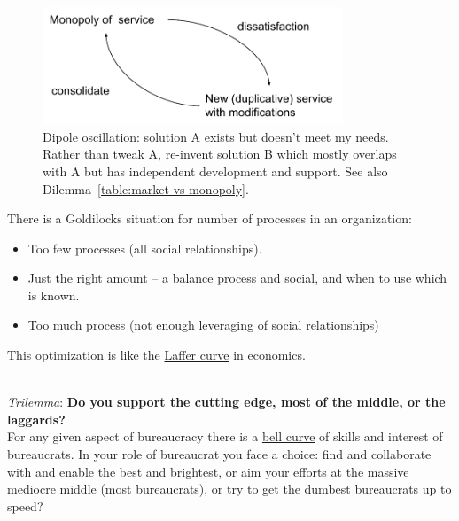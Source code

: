 \begin{figure}[H] %
    \centering
    \includegraphics[width=0.8\textwidth]{images/dilemma_market_vs_monopoly.pdf}
    \caption{Dipole oscillation: solution A exists but doesn't meet my needs. Rather than tweak A, re-invent solution B which mostly overlaps with A but has independent development and support. See also Dilemma~\ref{table:market-vs-monopoly}.}
    \label{fig:market-vs-monopoly}
\end{figure}



There is a Goldilocks situation for number of processes in an organization:
\begin{itemize}
    \item Too few processes (all social relationships).
    \item Just the right amount -- a balance process and social, and when to use which is known.
    \item Too much process (not enough leveraging of social relationships)
\end{itemize}
This optimization is like the \href{https://en.wikipedia.org/wiki/Laffer_curve}{Laffer curve} in economics.

\ \\

\textit{Trilemma}: \textbf{Do you support the cutting edge, most of the middle, or the laggards?}\\
For any given aspect of bureaucracy there is a \href{https://en.wikipedia.org/wiki/Normal_distribution}{bell curve} 
of skills and interest of bureaucrats. In your role of bureaucrat you face a choice: find and collaborate with and enable the best and brightest, or aim your efforts at the massive mediocre middle (most bureaucrats), or try to get the dumbest bureaucrats up to speed? 

